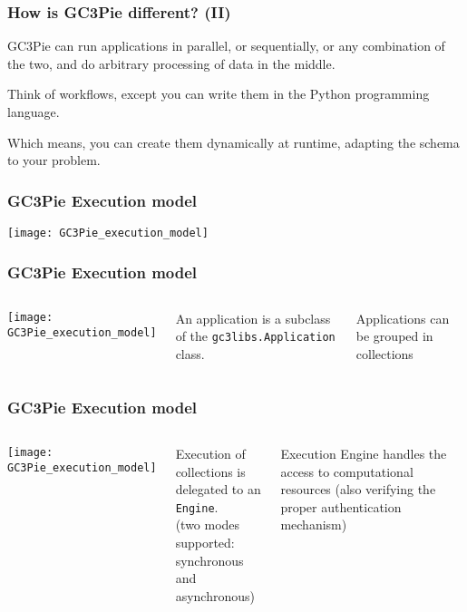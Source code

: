 \documentclass[english,serif,mathserif,xcolor=pdftex,dvipsnames,table]{beamer}
\begin{document}
\begin{frame}
  \frametitle{How is GC3Pie different? (II)}
  
  \begin{block}{}
    GC3Pie can run applications in parallel, or sequentially, or any
    combination of the two, and do arbitrary processing of data in the
    middle.
  \end{block}
  
  \begin{block}{}
    Think of {\color{Blue}workflows}, except you can write them in the Python
    programming language.
  \end{block}
  
  \begin{block}{}
    Which means, you can create them dynamically at runtime, adapting
    the schema to your problem.
  \end{block}
\end{frame}

\begin{frame}
  \frametitle{GC3Pie Execution model}
  \texttt{[image: GC3Pie\_execution\_model]}
\end{frame}

\begin{frame}
  \frametitle{GC3Pie Execution model}
  \begin{columns}
      \texttt{[image: GC3Pie\_execution\_model]}
  \begin{block}{}
    An application is a subclass of the \texttt{gc3libs.Application}
    class. \\
  \end{block}

  \begin{block}{}
    Applications can be grouped in {\color{Blue}collections}
  \end{block}
  \end{columns}
\end{frame}
  
\begin{frame}
  \frametitle{GC3Pie Execution model}
  \begin{columns}
      \texttt{[image: GC3Pie\_execution\_model]}
  \begin{block}{}
    Execution of collections is delegated to an \texttt{Engine}.\\
    (two modes supported: {\color{Blue}synchronous} and {\color{Blue}asynchronous})
  \end{block}

  \begin{block}{}
    Execution Engine handles the access to computational {\color{Blue}resources}
    (also verifying the proper {\color{Blue}authentication} mechanism)
  \end{block}
  \end{columns}
\end{frame}
\end{document}
